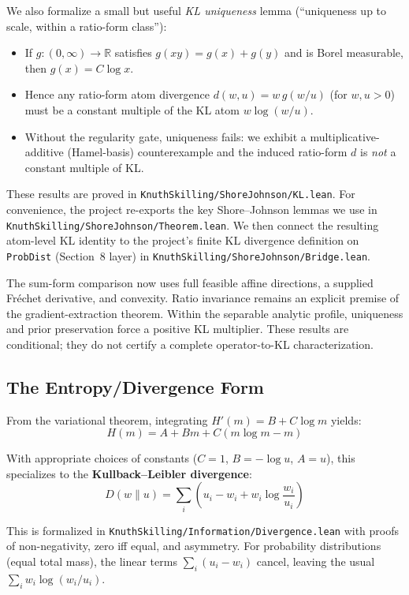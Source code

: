 \documentclass[11pt]{article}
\theoremstyle{definition}
\theoremstyle{remark}
\begin{document}
We also formalize a small but useful \emph{KL uniqueness} lemma (``uniqueness up to scale, within a
ratio-form class''):
\begin{itemize}
\item If $g:(0,\infty)\to\mathbb{R}$ satisfies $g(xy)=g(x)+g(y)$ and is Borel measurable, then $g(x)=C\log x$.
\item Hence any ratio-form atom divergence $d(w,u)=w\,g(w/u)$ (for $w,u>0$) must be a constant multiple of the KL atom
$w\log(w/u)$.
\item Without the regularity gate, uniqueness fails: we exhibit a multiplicative-additive (Hamel-basis) counterexample
and the induced ratio-form $d$ is \emph{not} a constant multiple of KL.
\end{itemize}
These results are proved in \texttt{KnuthSkilling/ShoreJohnson/KL.lean}.
For convenience, the project re-exports the key Shore--Johnson lemmas we use in
\texttt{KnuthSkilling/ShoreJohnson/Theorem.lean}.
We then connect the resulting atom-level KL identity to the project's finite KL divergence
definition on \texttt{ProbDist} (Section~8 layer) in
\texttt{KnuthSkilling/ShoreJohnson/Bridge.lean}.

The sum-form comparison now uses full feasible affine directions, a supplied
Fr\'echet derivative, and convexity. Ratio invariance remains an explicit premise
of the gradient-extraction theorem. Within the separable analytic profile,
uniqueness and prior preservation force a positive KL multiplier. These results
are conditional; they do not certify a complete operator-to-KL characterization.

\subsection{The Entropy/Divergence Form}

From the variational theorem, integrating $H'(m) = B + C \log m$ yields:
\[H(m) = A + Bm + C(m \log m - m)\]

With appropriate choices of constants ($C = 1$, $B = -\log u$, $A = u$), this specializes to the \textbf{Kullback--Leibler divergence}:
\[D(w \| u) = \sum_i \left( u_i - w_i + w_i \log \frac{w_i}{u_i} \right)\]

This is formalized in \texttt{KnuthSkilling/Information/Divergence.lean} with proofs of non-negativity, zero iff equal, and asymmetry.
For probability distributions (equal total mass), the linear terms $\sum_i (u_i - w_i)$ cancel, leaving the usual $\sum_i w_i \log(w_i/u_i)$.
\end{document}
